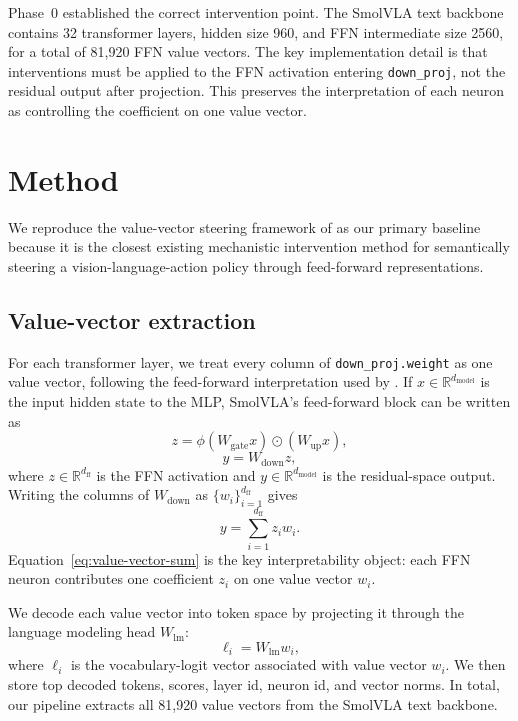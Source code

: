 \documentclass[11pt]{article}
\begin{document}
Phase~0 established the correct intervention point. The SmolVLA text backbone contains 32 transformer layers, hidden size 960, and FFN intermediate size 2560, for a total of 81{,}920 FFN value vectors. The key implementation detail is that interventions must be applied to the FFN activation entering \texttt{down\_proj}, not the residual output after projection. This preserves the interpretation of each neuron as controlling the coefficient on one value vector.

\section{Method}

We reproduce the value-vector steering framework of \citet{haon2025mechanistic} as our primary baseline because it is the closest existing mechanistic intervention method for semantically steering a vision-language-action policy through feed-forward representations.

\subsection{Value-vector extraction}

For each transformer layer, we treat every column of \texttt{down\_proj.weight} as one value vector, following the feed-forward interpretation used by \citet{haon2025mechanistic}. If $x \in \mathbb{R}^{d_{\text{model}}}$ is the input hidden state to the MLP, SmolVLA's feed-forward block can be written as
\begin{equation}
z = \phi(W_{\text{gate}}x) \odot (W_{\text{up}}x),
\end{equation}
\begin{equation}
y = W_{\text{down}} z,
\end{equation}
where $z \in \mathbb{R}^{d_{\text{ff}}}$ is the FFN activation and $y \in \mathbb{R}^{d_{\text{model}}}$ is the residual-space output. Writing the columns of $W_{\text{down}}$ as $\{w_i\}_{i=1}^{d_{\text{ff}}}$ gives
\begin{equation}
y = \sum_{i=1}^{d_{\text{ff}}} z_i w_i.
\label{eq:value-vector-sum}
\end{equation}
Equation~\ref{eq:value-vector-sum} is the key interpretability object: each FFN neuron contributes one coefficient $z_i$ on one value vector $w_i$.

We decode each value vector into token space by projecting it through the language modeling head $W_{\text{lm}}$:
\begin{equation}
\ell_i = W_{\text{lm}} w_i,
\label{eq:token-projection}
\end{equation}
where $\ell_i$ is the vocabulary-logit vector associated with value vector $w_i$. We then store top decoded tokens, scores, layer id, neuron id, and vector norms. In total, our pipeline extracts all 81{,}920 value vectors from the SmolVLA text backbone.
\end{document}
